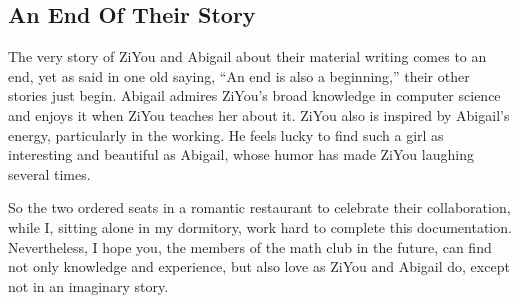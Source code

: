 \subsection{An End Of Their Story}
The very story of ZiYou and Abigail about their material writing comes to an end, yet as said in one old saying, ``An end is also a beginning,'' their other stories just begin. Abigail admires ZiYou's broad knowledge in computer science and enjoys it when ZiYou teaches her about it. ZiYou also is inspired by Abigail's energy, particularly in the working. He feels lucky to find such a girl as interesting and beautiful as Abigail, whose humor has made ZiYou laughing several times.

So the two ordered seats in a romantic restaurant to celebrate their collaboration, while I, sitting alone in my dormitory, work hard to complete this documentation. Nevertheless, I hope you, the members of the math club in the future, can find not only knowledge and experience, but also love as ZiYou and Abigail do, except not in an imaginary story.